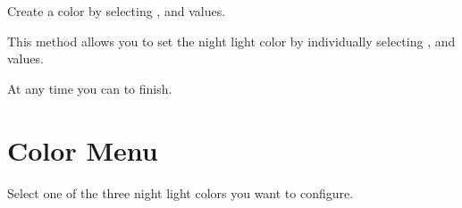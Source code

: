 
 \par\medskip

Create a color by selecting ,  and  values.

\par\medskip

This method allows you to set the night light color by individually selecting
,  and  values.


At any time you can  to finish.


\section{Color Menu} 

Select one of the three night light colors you want to configure.

\par\medskip

